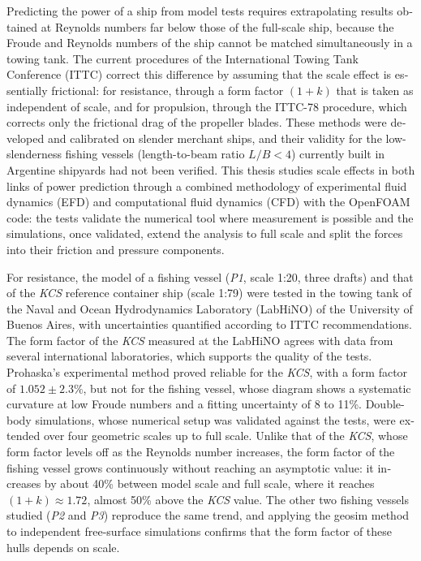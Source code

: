 \clearpage
\begin{otherlanguage}{english}

\begin{ResumenPlantilla}
Predicting the power of a ship from model tests requires extrapolating results
obtained at Reynolds numbers far below those of the full-scale ship, because
the Froude and Reynolds numbers of the ship cannot be matched simultaneously in
a towing tank. The current procedures of the International Towing Tank
Conference (ITTC) correct this difference by assuming that the scale effect is
essentially frictional: for resistance, through a form factor $(1+k)$ that is
taken as independent of scale, and for propulsion, through the ITTC-78
procedure, which corrects only the frictional drag of the propeller blades.
These methods were developed and calibrated on slender merchant ships, and
their validity for the low-slenderness fishing vessels (length-to-beam ratio
$L/B < 4$) currently built in Argentine shipyards had not been verified. This
thesis studies scale effects in both links of power prediction through a
combined methodology of experimental fluid dynamics (EFD) and computational
fluid dynamics (CFD) with the OpenFOAM code: the tests validate the numerical
tool where measurement is possible and the simulations, once validated, extend
the analysis to full scale and split the forces into their friction and
pressure components.

For resistance, the model of a fishing vessel (\textit{P1}, scale 1:20, three
drafts) and that of the \textit{KCS} reference container ship (scale 1:79) were
tested in the towing tank of the Naval and Ocean Hydrodynamics Laboratory
(LabHiNO) of the University of Buenos Aires, with uncertainties quantified
according to ITTC recommendations. The form factor of the \textit{KCS} measured
at the LabHiNO agrees with data from several international laboratories, which
supports the quality of the tests. Prohaska's experimental method proved
reliable for the \textit{KCS}, with a form factor of $1.052 \pm 2.3\%$, but not
for the fishing vessel, whose diagram shows a systematic curvature at low Froude
numbers and a fitting uncertainty of 8 to 11\%. Double-body simulations, whose
numerical setup was validated against the tests, were extended over four
geometric scales up to full scale. Unlike that of the \textit{KCS}, whose form
factor levels off as the Reynolds number increases, the form factor of the
fishing vessel grows continuously without reaching an asymptotic value: it
increases by about 40\% between model scale and full scale, where it reaches
$(1+k) \approx 1.72$, almost 50\% above the \textit{KCS} value. The other two
fishing vessels studied (\textit{P2} and \textit{P3}) reproduce the same trend,
and applying the geosim method to independent free-surface simulations confirms
that the form factor of these hulls depends on scale.


\end{ResumenPlantilla}
\end{otherlanguage}

